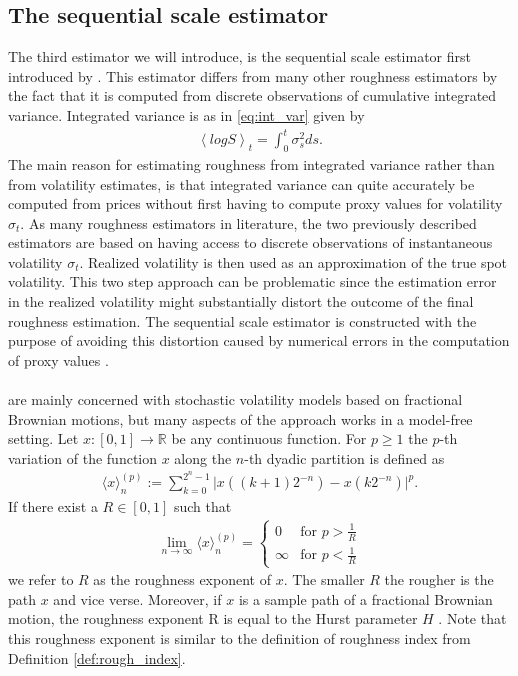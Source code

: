 \documentclass{article}
\begin{document}
\subsection{The sequential scale estimator}
The third estimator we will introduce, is the sequential scale estimator first introduced by \cite{han}. This estimator differs from many other roughness estimators by the fact that it is computed from discrete observations of cumulative integrated variance. Integrated variance is as in \eqref{eq:int_var} given by
\begin{align*}
\left\langle log S \right\rangle_t = \int_0^t \sigma_s^2 ds.
\end{align*}
The main reason for estimating roughness from integrated variance rather than from volatility estimates, is that integrated variance can quite accurately be computed from prices without first having to compute proxy values for volatility $\sigma_t$. As many roughness estimators in literature, the two previously described estimators are based on having access to discrete observations of instantaneous volatility $\sigma_t$. Realized volatility is then used as an approximation of the true spot volatility. This two step approach can be problematic since the estimation error in the realized volatility might substantially distort the outcome of the final roughness estimation. The sequential scale estimator is constructed with the purpose of avoiding this distortion caused by numerical errors in the computation of proxy values \cite{han}.\\\\
\cite{han} are mainly concerned with stochastic volatility models based on fractional Brownian motions, but many aspects of the approach works in a model-free setting. Let $x: [0,1] \rightarrow \mathbb{R}$ be any continuous function. For $p\geq 1$ the $p$-th variation of the function $x$ along the $n$-th dyadic partition is defined as
\begin{align*}
\langle x \rangle^{(p)}_n := \sum_{k=0}^{2^n-1} \lvert x((k+1)2^{-n})-x(k2^{-n})\rvert^p.
\end{align*}
If there exist a $R\in [0,1]$ such that
\begin{align*}
\lim_{n\rightarrow\infty}\langle x \rangle^{(p)}_n =
\begin{cases} 
0 & \text{for } p > \frac{1}{R} \\
\infty & \text{for } p < \frac{1}{R}
\end{cases}
\end{align*}
we refer to $R$ as the roughness exponent of $x$. The smaller $R$ the rougher is the path $x$ and vice verse. Moreover, if $x$ is a sample path of a fractional Brownian motion, the roughness exponent R is equal to the Hurst parameter $H$ \cite{han}. Note that this roughness exponent is similar to the definition of roughness index from Definition \ref{def:rough_index}. \\\\
\end{document}
